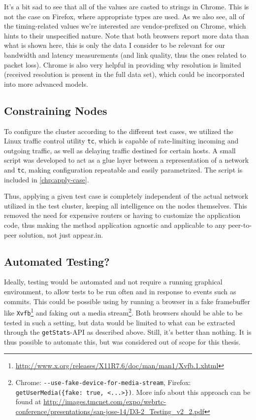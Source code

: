 It's a bit sad to see that all of the values are casted to strings in Chrome. This is not the case on Firefox, where appropriate types are used. As we also see, all of the timing-related values we're interested are vendor-prefixed on Chrome, which hints to their unspecified nature. Note that both browsers report more data than what is shown here, this is only the data I consider to be relevant for our bandwidth and latency measurements (and link quality, thus the ones related to packet loss). Chrome is also very helpful in providing why resolution is limited (received resolution is present in the full data set), which could be incorporated into more advanced models.


\subsection{Constraining Nodes}

To configure the cluster according to the different test cases, we utilized the Linux traffic control utility \texttt{tc}, which is capable of rate-limiting incoming and outgoing traffic, as well as delaying traffic destined for certain hosts. A small script was developed to act as a glue layer between a representation of a network and \texttt{tc}, making configuration repeatable and easily parametrized. The script is included in \autoref{chp:apply-case}.

Thus, applying a given test case is completely independent of the actual network utilized in the test cluster, keeping all intelligence on the nodes themselves. This removed the need for expensive routers or having to customize the application code, thus making the method application agnostic and applicable to any peer-to-peer solution, not just appear.in.


\subsection{Automated Testing?}\label{subsec:automated-testing}

Ideally, testing would be automated and not require a running graphical environment, to allow tests to be run often and in response to events such as commits. This could be possible using by running a browser in a fake framebuffer like \texttt{Xvfb}\footnote{\url{http://www.x.org/releases/X11R7.6/doc/man/man1/Xvfb.1.xhtml}} and faking out a media stream\footnote{Chrome: \texttt{-{}-use-fake-device-for-media-stream}, Firefox: \texttt{getUserMedia(\{fake: true, <...>\})}. More info about this approach can be found at \url{http://images.tmcnet.com/expo/webrtc-conference/presentations/san-jose-14/D3-2_Testing_v2_2.pdf}}. Both browsers should be able to be tested in such a setting, but data would be limited to what can be extracted through the \texttt{getStats}-API as described above. Still, it's better than nothing. It is thus possible to automate this, but was considered out of scope for this thesis.


